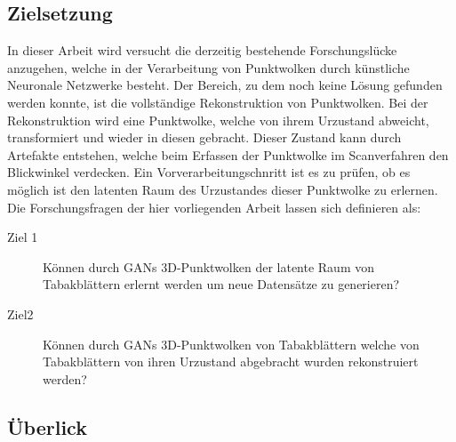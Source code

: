 \documentclass{llncs}
\begin{document}
\subsection{Zielsetzung}\label{ref:objective}

In dieser Arbeit wird versucht die derzeitig bestehende Forschungslücke anzugehen, welche in der Verarbeitung von Punktwolken durch künstliche Neuronale Netzwerke besteht. Der Bereich, zu dem noch keine Lösung gefunden werden konnte, ist die vollständige Rekonstruktion von Punktwolken. Bei der Rekonstruktion wird eine Punktwolke, welche von ihrem Urzustand abweicht, transformiert und wieder in diesen gebracht. Dieser Zustand kann durch Artefakte entstehen, welche beim Erfassen der Punktwolke im Scanverfahren den Blickwinkel verdecken. Ein Vorverarbeitungschnritt ist es zu prüfen, ob es möglich ist den latenten Raum des Urzustandes dieser Punktwolke zu erlernen. Die Forschungsfragen der hier vorliegenden Arbeit lassen sich definieren als:


\begin{description}
\item[Ziel 1]
Können durch GANs 3D-Punktwolken der latente Raum von Tabakblättern erlernt werden um neue Datensätze zu generieren?\\
 	
\item[Ziel2] Können durch GANs 3D-Punktwolken von Tabakblättern welche von Tabakblättern von ihren Urzustand abgebracht wurden rekonstruiert werden? 
\end{description}

\subsection{Überlick}
\end{document}
